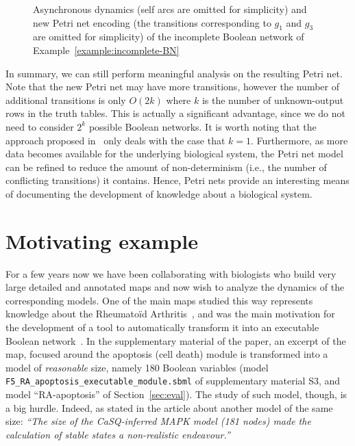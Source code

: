 \documentclass[preprint,12pt]{elsarticle}
\begin{document}
\begin{figure}[!htb]
\begin{subfigure}[b]{0.6\textwidth}
		\caption{}%
	\end{subfigure}%
	\caption{Asynchronous dynamics (self arcs are omitted for simplicity) and new Petri net encoding (the transitions corresponding to \(g_1\) and \(g_3\) are omitted for simplicity) of the incomplete Boolean network of Example~\ref{example:incomplete-BN}}%
	\label{fig:incomplete-dynamics-new-PN}
\end{figure}

In summary, we can still perform meaningful analysis on the resulting Petri net.
Note that the new Petri net may have more transitions, however the number of additional transitions is only \(O(2k)\) where \(k\) is the number of unknown-output rows in the truth tables.
This is actually a significant advantage, since we do not need to consider \(2^k\) possible Boolean networks.
It is worth noting that the approach proposed in~\cite{Steggles2006} only deals with the case that \(k = 1\).
Furthermore, as more data becomes available for the underlying biological system, the Petri net model can be refined to reduce the
amount of non-determinism (i.e., the number of conflicting transitions) it contains.
Hence, Petri nets provide an interesting means of documenting the development of knowledge about a biological system. 

\section{Motivating example}
\label{sec:case_study}

For a few years now we have been collaborating with biologists who build very large detailed and annotated maps and now wish to analyze the dynamics of the corresponding models.
One of the main maps studied this way represents knowledge about the Rheumatoïd Arthritis~\cite{singh2018computational}, and was the main motivation for the development of a tool to automatically transform it into an executable Boolean network~\cite{aghamiri2020automated}.
In the supplementary material of the paper, an excerpt of the map, focused around the apoptosis (cell death) module is transformed into a model of \emph{reasonable} size, namely 180 Boolean variables (model \verb|F5_RA_apoptosis_executable_module.sbml| of supplementary material S3, and model ``RA-apoptosis'' of Section~\ref{sec:eval}).
The study of such model, though, is a big hurdle.
Indeed, as stated in the article about another model of the same size:
\emph{``The size of the CaSQ-inferred MAPK model (181 nodes) made the calculation of stable states a non-realistic endeavour.''}
\end{document}
